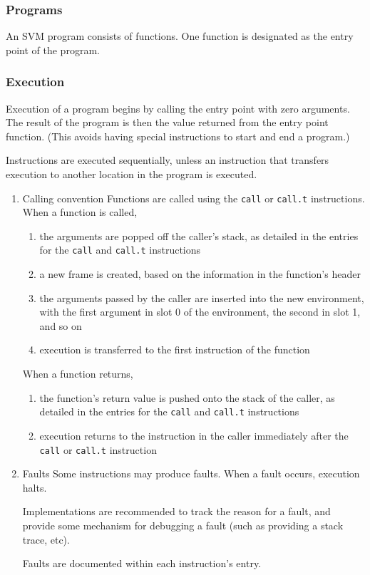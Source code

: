 \subsubsection{Programs}
\label{sec:org9630e8e}
An SVM program consists of functions. One function is designated as the
entry point of the program.

\subsubsection{Execution}
\label{sec:org3db4c57}
Execution of a program begins by calling the entry point with zero
arguments. The result of the program is then the value returned from the
entry point function. (This avoids having special instructions to start
and end a program.)

Instructions are executed sequentially, unless an instruction that
transfers execution to another location in the program is executed.

\begin{enumerate}
\item Calling convention
\label{sec:orgd5ca986}
Functions are called using the \texttt{call} or \texttt{call.t} instructions. When a
function is called,

\begin{enumerate}
\item the arguments are popped off the caller's stack, as detailed in the
entries for the \texttt{call} and \texttt{call.t} instructions
\item a new frame is created, based on the information in the function's
header
\item the arguments passed by the caller are inserted into the new
environment, with the first argument in slot 0 of the environment,
the second in slot 1, and so on
\item execution is transferred to the first instruction of the function
\end{enumerate}

When a function returns,

\begin{enumerate}
\item the function's return value is pushed onto the stack of the caller,
as detailed in the entries for the \texttt{call} and \texttt{call.t} instructions
\item execution returns to the instruction in the caller immediately after
the \texttt{call} or \texttt{call.t} instruction
\end{enumerate}

\item Faults
\label{sec:org8f767f1}
Some instructions may produce faults. When a fault occurs, execution
halts.

Implementations are recommended to track the reason for a fault, and
provide some mechanism for debugging a fault (such as providing a stack
trace, etc).

Faults are documented within each instruction's entry.
\end{enumerate}

